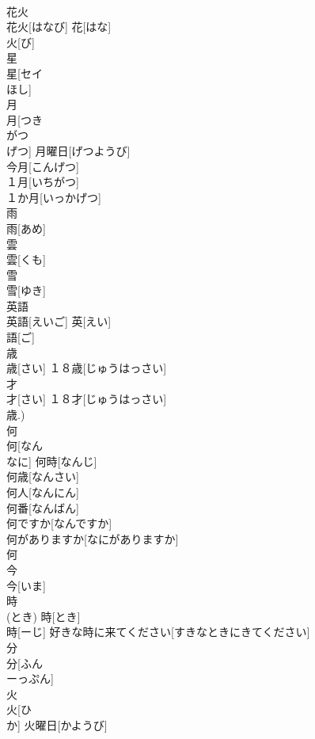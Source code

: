 \documentclass[8pt]{extreport}
\begin{document}
\begin{CJK}{UTF8}{min}
\\	花火	
\\	花火[はなび]	花[はな] 
\\	火[び] 
\\	星	
\\	星[セイ 
\\	ほし]	
\\	月	
\\	月[つき 
\\	がつ 
\\	げつ]	月曜日[げつようび] 
\\	今月[こんげつ] 
\\	１月[いちがつ] 
\\	１か月[いっかげつ] 
\\	雨	
\\	雨[あめ]	
\\	雲	
\\	雲[くも]	
\\	雪	
\\	雪[ゆき]	
\\	英語	
\\	英語[えいご]	英[えい] 
\\	語[ご] 
\\	歳	
\\	歳[さい]	１８歳[じゅうはっさい] 
\\	才	
\\	才[さい]	１８才[じゅうはっさい] 
\\	歳.)
\\	何	
\\	何[なん 
\\	なに]	何時[なんじ] 
\\	何歳[なんさい] 
\\	何人[なんにん] 
\\	何番[なんばん] 
\\	何ですか[なんですか] 
\\	何がありますか[なにがありますか] 
\\	何 
\\	今	
\\	今[いま]	
\\	時	
\\	(とき)	時[とき] 
\\	時[ーじ]	好きな時に来てください[すきなときにきてください] 
\\	分	
\\	分[ふん 
\\	ーっぷん]	
\\	火	
\\	火[ひ 
\\	か]	火曜日[かようび] 

\end{CJK}
\end{document}
